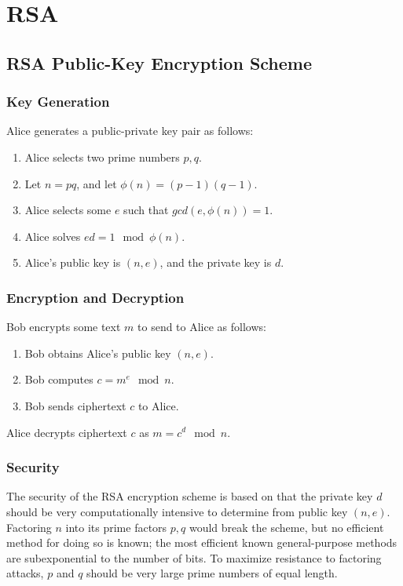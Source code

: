 \documentclass[12pt,titlepage]{article}
\let\stdsection\section
\renewcommand\section{\clearpage\stdsection}
\begin{document}
  \section{RSA}

    \subsection{RSA Public-Key Encryption Scheme}
            
      \subsubsection{Key Generation}
        Alice generates a public-private key pair as follows:
        \begin{enumerate}
          \item Alice selects two prime numbers $p, q$.
          \item Let $n = pq$, and let $\phi(n) = (p - 1)(q - 1)$.
          \item Alice selects some $e$ such that $gcd(e, \phi(n)) = 1$.
          \item Alice solves $ed = 1 \mod \phi(n)$.
          \item Alice's public key is $(n, e)$, and the private key is $d$.
        \end{enumerate}

      \subsubsection{Encryption and Decryption}
        Bob encrypts some text $m$ to send to Alice as follows:
        \begin{enumerate}
          \item Bob obtains Alice's public key $(n, e)$.
          \item Bob computes $c = m^e \mod n$.
          \item Bob sends ciphertext $c$ to Alice.
        \end{enumerate}

        Alice decrypts ciphertext $c$ as $m = c^d \mod n$.

      \subsubsection{Security}
        The security of the RSA encryption scheme is based on that the private key $d$ should be
        very computationally intensive to determine from public key $(n, e)$. Factoring $n$ into
        its prime factors $p, q$ would break the scheme, but no efficient method for doing
        so is known; the most efficient known general-purpose methods are subexponential to
        the number of bits. To maximize resistance to factoring attacks, $p$ and $q$ should
        be very large prime numbers of equal length.
\end{document}
